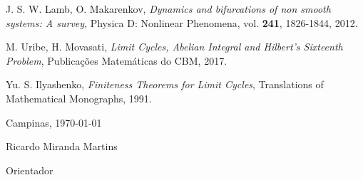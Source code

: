 \documentclass[12pt]{article}
\begin{document}
\begin{thebibliography}{99}



 {\sc J. S. W. Lamb, O. Makarenkov}, {\it Dynamics and bifurcations of non smooth systems: A survey}, Physica D: Nonlinear Phenomena, vol. \textbf{241}, 1826-1844, 2012.

 M. Uribe, H. Movasati, {\it Limit Cycles, Abelian Integral and Hilbert’s Sixteenth Problem}, Publicações Matemáticas do CBM, 2017.


 Yu. S. Ilyashenko, {\it Finiteness Theorems for Limit Cycles}, Translations of Mathematical Monographs, 1991.




\end{thebibliography}



\bigskip

\bigskip

Campinas, \today


\bigskip

\bigskip

Ricardo Miranda Martins

Orientador
\end{document}
